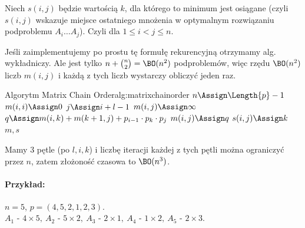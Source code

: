 Niech $s(i, j)$ będzie wartością $k$, dla którego to minimum jest osiągane (czyli $s(i, j)$ wskazuje miejsce ostatniego mnożenia w optymalnym rozwiązaniu podproblemu $A_i \dots A_j$). Czyli dla $1 \leq i < j \leq n$.

Jeśli zaimplementujemy po prostu tę formułę rekurencyjną otrzymamy alg. wykładniczy. Ale jest tylko $n + \binom{n}{2} = \BO(n^2)$ podproblemów, więc rzędu $\BO(n^2)$ liczb $m(i, j)$ i każdą z tych liczb wystarczy obliczyć jeden raz.

\begin{alg}{Algorytm Matrix Chain Order}{alg:matrixchainorder}
	\State $n \Assign \Length{p} - 1$
	\State $m(i, i) \Assign 0$
	\EndFor
	 
	 
	\State $j \Assign i + l - 1$ 
	\State $m(i, j) \Assign \infty$ 
	\State $q \Assign m(i, k) + m(k + 1, j) + p_{i-1} \cdot p_k \cdot p_j$
	\State $m(i, j) \Assign q$
	\State $s(i, j) \Assign k$
	\EndIf
	\EndFor
	\EndFor
	\EndFor
	\State \Return $m, s$
	\EndFunction
\end{alg}

Mamy 3 pętle (po $l, i, k$) i liczbę iteracji każdej z tych pętli można ograniczyć przez $n$, zatem złożoność czasowa to $\BO(n^3)$.

\paragraph{Przykład:} $n=5$, $p=(4, 5, 2, 1, 2, 3)$. \\
$A_1 \text{ - } 4 \times 5,\ A_2 \text{ - } 5 \times 2,\ A_3 \text{ - } 2 \times 1,\ A_4 \text{ - } 1 \times 2,\ A_5 \text{ - } 2 \times 3$.

